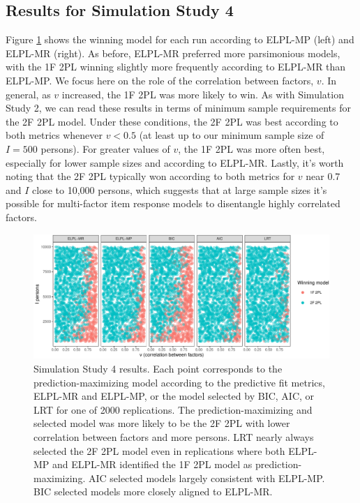 \documentclass[
  english,
  man,floatsintext]{apa7}
\begin{document}
\hypertarget{results-for-simulation-study-4}{%
\subsection{Results for Simulation Study 4}\label{results-for-simulation-study-4}}

Figure \ref{fig:results6a} shows the winning model for each run according to ELPL-MP (left) and ELPL-MR (right). As before, ELPL-MR preferred more parsimonious models, with the 1F 2PL winning slightly more frequently according to ELPL-MR than ELPL-MP. We focus here on the role of the correlation between factors, \(v\). In general, as \(v\) increased, the 1F 2PL was more likely to win. As with Simulation Study 2, we can read these results in terms of minimum sample requirements for the 2F 2PL model. Under these conditions, the 2F 2PL was best according to both metrics whenever \(v < 0.5\) (at least up to our minimum sample size of \(I = 500\) persons). For greater values of \(v\), the 1F 2PL was more often best, especially for lower sample sizes and according to ELPL-MR. Lastly, it's worth noting that the 2F 2PL typically won according to both metrics for \(v\) near 0.7 and \(I\) close to 10,000 persons, which suggests that at large sample sizes it's possible for multi-factor item response models to disentangle highly correlated factors.

\begin{figure}

{\centering \includegraphics[width=2100px]{irt-predictive-fit-apa_files/figure-latex/results6a-1} 

}

\caption{Simulation Study 4 results. Each point corresponds to the prediction-maximizing model according to the predictive fit metrics, ELPL-MR and ELPL-MP, or the model selected by BIC, AIC, or LRT for one of 2000 replications. The prediction-maximizing and selected model was more likely to be the 2F 2PL with lower correlation between factors and more persons. LRT nearly always selected the 2F 2PL model even in replications where both ELPL-MP and ELPL-MR identified the 1F 2PL model as prediction-maximizing. AIC selected models largely consistent with ELPL-MP. BIC selected models more closely aligned to ELPL-MR.}\label{fig:results6a}
\end{figure}
\end{document}
